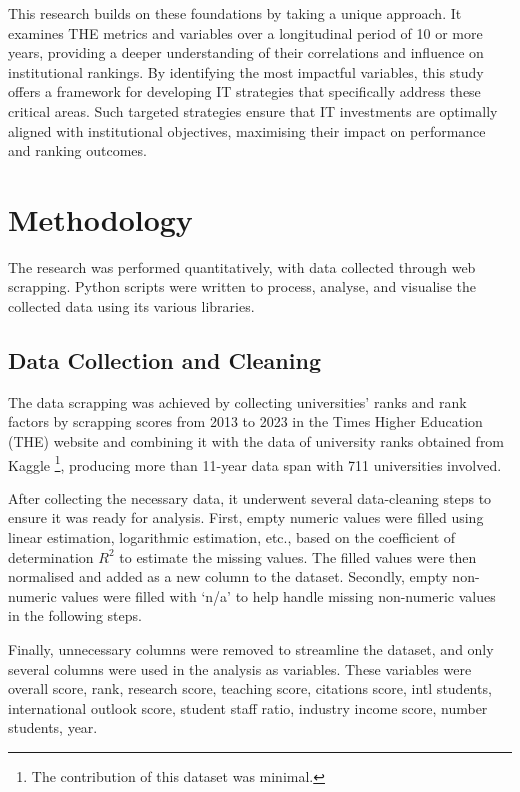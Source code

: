 \documentclass[sigconf]{acmart}
\begin{document}
This research builds on these foundations by taking a unique approach. It examines THE metrics and variables over a longitudinal period of 10 or more years, providing a deeper understanding of their correlations and influence on institutional rankings. By identifying the most impactful variables, this study offers a framework for developing IT strategies that specifically address these critical areas. Such targeted strategies ensure that IT investments are optimally aligned with institutional objectives, maximising their impact on performance and ranking outcomes.


\section{Methodology}
\label{sec:methodology}

The research was performed quantitatively, with data collected through web scrapping. Python scripts were written to process, analyse, and visualise the collected data using its various libraries. 

\subsection{Data Collection and Cleaning}

The data scrapping was achieved by collecting universities' ranks and rank factors by scrapping scores from 2013 to 2023 in the Times Higher Education (THE) website \cite{the2024} and combining it with the data of university ranks obtained from Kaggle \cite{ONeil_2020}\footnote{The contribution of this dataset was minimal.}, producing more than 11-year data span with 711 universities involved. 

After collecting the necessary data, it underwent several data-cleaning steps to ensure it was ready for analysis. First, empty numeric values were filled using linear estimation, logarithmic estimation, etc., based on the coefficient of determination $R^{2}$ to estimate the missing values. The filled values were then normalised and added as a new column to the dataset. Secondly, empty non-numeric values were filled with `n/a' to help handle missing non-numeric values in the following steps.

Finally, unnecessary columns were removed to streamline the dataset, and only several columns were used in the analysis as variables. These variables were overall score, rank, research score, teaching score, citations score, intl students, international outlook score, student staff ratio, industry income score, number students, year. 
\end{document}

